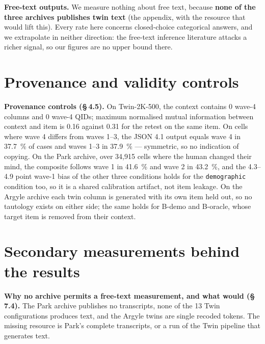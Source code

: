 \documentclass[sigconf,anonymous,review]{acmart}
\begin{document}
\textbf{Free-text outputs.} We measure nothing about free text, because \textbf{none of the three archives publishes twin text} (the appendix, with the resource that would lift this). Every rate here concerns closed-choice categorical answers, and we extrapolate in neither direction: the free-text inference literature \cite{staab2024beyond,ko2026weakcues} attacks a richer signal, so our figures are no upper bound there.

\label{corps:fin}

\appendix

\section{Provenance and validity controls}

\textbf{Provenance controls (\S\,4.5).} On Twin-2K-500, the context contains 0 wave-4 columns and 0 wave-4 QIDs; maximum normalised mutual information between context and item is 0.16 against 0.31 for the retest on the same item. On cells where wave 4 differs from waves 1--3, the JSON 4.1 output equals wave 4 in 37.7~\% of cases and waves 1--3 in 37.9~\% --- symmetric, so no indication of copying. On the Park archive, over 34,915 cells where the human changed their mind, the composite follows wave 1 in 41.6~\% and wave 2 in 43.2~\%, and the 4.3--4.9 point wave-1 bias of the other three conditions holds for the \texttt{demographic} condition too, so it is a shared calibration artifact, not item leakage. On the Argyle archive each twin column is generated with its own item held out, so no tautology exists on either side; the same holds for B-demo and B-oracle, whose target item is removed from their context.

\section{Secondary measurements behind the results}

\textbf{Why no archive permits a free-text measurement, and what would (\S\,7.4).} The Park archive publishes no transcripts, none of the 13 Twin configurations produces text, and the Argyle twins are single recoded tokens. The missing resource is Park's complete transcripts, or a run of the Twin pipeline that generates text.
\end{document}
